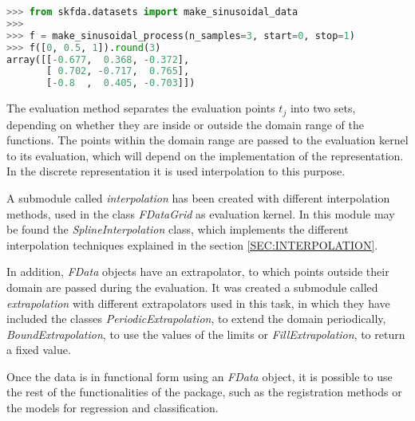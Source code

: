 \lstset{frame=lines}

\begin{lstlisting}[language=Python]
>>> from skfda.datasets import make_sinusoidal_data
>>>
>>> f = make_sinusoidal_process(n_samples=3, start=0, stop=1)
>>> f([0, 0.5, 1]).round(3)
array([[-0.677,  0.368, -0.372],
       [ 0.702, -0.717,  0.765],
       [-0.8  ,  0.405, -0.703]])
\end{lstlisting}



The evaluation method separates the evaluation points $t_j$ into two sets, depending on
whether they are inside or outside the domain range of the functions. The points
within the domain range are passed to the evaluation kernel to its evaluation,
which will depend  on the implementation of the representation. In the discrete
representation it is used interpolation to this purpose.

A submodule called \textit{interpolation} has been created with different
interpolation methods, used in the class \textit{FDataGrid} as evaluation kernel.
In this module may be found the \textit{SplineInterpolation} class,
which implements the different interpolation techniques explained in the
section \ref{SEC:INTERPOLATION}.

In addition, \textit{FData} objects have an extrapolator, to which
points outside their domain are passed during the evaluation. It was created
a submodule called \textit{extrapolation} with different extrapolators used in
this task,
in which they have included the classes \textit{PeriodicExtrapolation}, to
extend the domain periodically, \textit{BoundExtrapolation}, to use the
values of the limits or \textit{FillExtrapolation}, to return a fixed value.

Once the data is in functional form using an \textit{FData} object,
it is possible to use the rest of the functionalities of the package, such as
the registration methods or the models for regression and classification.

